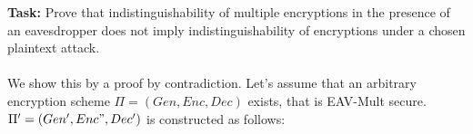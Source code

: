 \textbf{Task:} Prove that indistinguishability of multiple encryptions in the presence of an eavesdropper does
not imply indistinguishability of encryptions under a chosen plaintext attack.\\
\\
We show this by a proof by contradiction. Let's assume that an arbitrary encryption scheme \(\Pi = (Gen, Enc, Dec)\) exists, that is EAV-Mult secure.\\
\(\Pi' = (Gen', Enc", Dec')\) is constructed as follows: